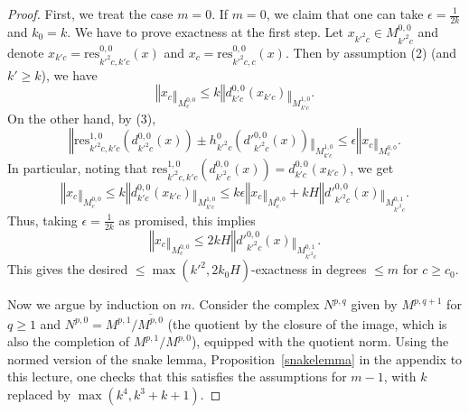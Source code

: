 \begin{proof}
  \leanok
  First, we treat the case $m=0$.
  If $m=0$, we claim that one can take $\epsilon=\tfrac 1{2k}$ and $k_0=k$.
  We have to prove exactness at the first step.
  Let $x_{k'^2c}\in M^{0,0}_{k'^2c}$ and
  denote $x_{k'c}=\mathrm{res}_{k'^2c,k'c}^{0,0}(x)$
  and $x_c=\mathrm{res}_{k'^2c,c}^{0,0}(x)$.
  Then by assumption (2) (and $k'\geq k$), we have
  \[
  ‖x_c‖_{M^{0,0}_c}\leq k‖d^{0,0}_{k'c}(x_{k'c})‖_{M^{1,0}_{k'c}}.
  \]
  On the other hand, by (3),
  \[
  ‖\mathrm{res}_{k'^2c,k'c}^{1,0}(d^{0,0}_{k'^2c}(x))\pm h^0_{k'^2c}(d'^{0,0}_{k'^2c}(x))‖_{M^{1,0}_{k'c}}\leq \epsilon ‖x_c‖_{M^{0,0}_c}.
  \]
  In particular, noting that $\mathrm{res}_{k'^2c,k'c}^{1,0}(d^{0,0}_{k'^2c}(x)) = d^{0,0}_{k'c}(x_{k'c})$, we get
  \[
  ‖x_c‖_{M^{0,0}_c}\leq k‖d^{0,0}_{k'c}(x_{k'c})‖_{M^{1,0}_{k'c}}\leq k\epsilon ‖x_c‖_{M^{0,0}_c} + kH ‖d'^{0,0}_{k'^2c}(x)‖_{M^{0,1}_{k'^2c}}.
  \]
  Thus, taking $\epsilon=\tfrac 1{2k}$ as promised, this implies
  \[
  ‖x_c‖_{M^{0,0}_c}\leq 2kH ‖d'^{0,0}_{k'^2c}(x)‖_{M^{0,1}_{k'^2c}}.
  \]
  This gives the desired $\leq \max(k'^2,2k_0H)$-exactness in degrees $\leq m$ for $c\geq c_0$.

  Now we argue by induction on $m$.
  Consider the complex $N^{p,q}$ given by $M^{p,q+1}$ for $q\geq 1$
  and $N^{p,0} = M^{p,1}/\overline{M^{p,0}}$
  (the quotient by the closure of the image, which is also the completion of $M^{p,1}/M^{p,0}$),
  equipped with the quotient norm.
  Using the normed version of the snake lemma,
  Proposition~\ref{snakelemma} in the appendix to this lecture,
  one checks that this satisfies the assumptions for $m-1$,
  with $k$ replaced by $\max(k^4,k^3+k+1)$.
\end{proof}

